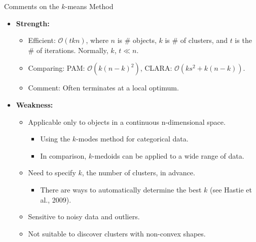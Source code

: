 \begin{frame}{Comments on the $k$-means Method}
	\begin{itemize}
		\item \textbf{Strength:}
		\begin{itemize}
			\item Efficient: $\mathcal{O}(tkn)$, where $n$ is $\#$ objects, $k$ 
			is $\#$ of clusters, and $t$ is the $\#$ of iterations. Normally, 
			$k$, $t \ll n$.
			\item Comparing: PAM: $\mathcal{O}(k(n-k)^2)$, CLARA: 
			$\mathcal{O}(ks^2 + k(n-k))$.
			\item Comment: Often terminates at a local optimum.
		\end{itemize}
		\item \textbf{Weakness:}
		\begin{itemize}
			\item Applicable only to objects in a continuous n-dimensional 
			space.
			\begin{itemize}
				\item Using the $k$-modes method for categorical data.
				\item In comparison, $k$-medoids can be applied to a wide range 
				of data.
			\end{itemize}
			\item Need to specify $k$, the number of clusters, in advance.
			\begin{itemize}
				\item There are ways to automatically determine the best $k$ 
				(see Hastie et al., 2009).
			\end{itemize}
			\item Sensitive to noisy data and outliers.
			\item Not suitable to discover clusters with non-convex shapes.
		\end{itemize}
	\end{itemize}
\end{frame}

